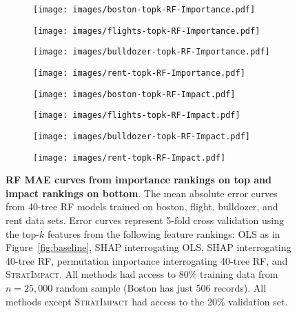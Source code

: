 \documentclass[smallextended]{svjour3}       %
\newcommand{\figref}[1]{Figure~\ref{#1}}
\newcommand{\simp}{\fontfamily{cmr}\textsc{\small StratImpact}}
\begin{document}
\begin{figure}
\centering
\begin{subfigure}{.245\textwidth}
    \centering
\texttt{[image: images/boston-topk-RF-Importance.pdf]}
\end{subfigure}%
\hfill
\begin{subfigure}{.245\textwidth}
    \centering
\texttt{[image: images/flights-topk-RF-Importance.pdf]}
\end{subfigure}
\hfill
\begin{subfigure}{.245\textwidth}
    \centering
\texttt{[image: images/bulldozer-topk-RF-Importance.pdf]}
\end{subfigure}%
\hfill
\begin{subfigure}{.245\textwidth}
    \centering
\texttt{[image: images/rent-topk-RF-Importance.pdf]}
\end{subfigure}

\vspace{1mm}
\begin{subfigure}{.245\textwidth}
    \centering
\texttt{[image: images/boston-topk-RF-Impact.pdf]}
\vspace{-5mm}
\subcaption{}
\end{subfigure}%
\hfill
\begin{subfigure}{.25\textwidth}
    \centering
\texttt{[image: images/flights-topk-RF-Impact.pdf]}
\vspace{-5mm}
\subcaption{}
\end{subfigure}
\hfill
\begin{subfigure}{.25\textwidth}
    \centering
\texttt{[image: images/bulldozer-topk-RF-Impact.pdf]}
\vspace{-5mm}
\subcaption{}
\end{subfigure}%
\hfill
\begin{subfigure}{.245\textwidth}
    \centering
\texttt{[image: images/rent-topk-RF-Impact.pdf]}
\vspace{-5mm}
\subcaption{}
\end{subfigure}
\vspace{-3mm}
\caption[short]{\small {\bf RF MAE curves from {\bf importance} rankings on top and {\bf impact} rankings on bottom}. The mean absolute error curves from 40-tree RF models trained on boston, flight, bulldozer, and rent data sets. Error curves represent 5-fold cross validation using the top-$k$ features from the following feature rankings: OLS as in \figref{fig:baseline}, SHAP interrogating OLS, SHAP interrogating 40-tree RF, permutation importance interrogating 40-tree RF, and \simp{}. All methods had access to 80\% training data from $n=25,000$ random sample (Boston has just 506 records).  All methods except \simp{} had access to the 20\% validation set.}
\label{fig:topk}
\end{figure}
\end{document}
